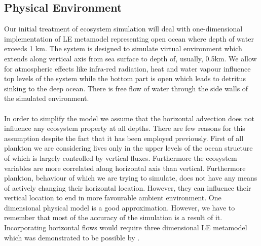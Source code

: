 \documentclass[12pt, a4paper]{report}
\begin{document}
\subsection{Physical Environment}\label{subsec:microsom}
Our initial treatment of ecosystem simulation will deal with one-dimensional implementation of LE metamodel
representing open ocean where depth of water exceeds 1 km. The system is designed to simulate virtual
environment which extends along vertical axis from sea surface to depth of, usually, 0.5km. We allow
for atmospheric effects like infra-red radiation, heat and water vapour influence top levels of the system
while the bottom part is open which leads to detritus sinking to the deep ocean. There is free flow
of water through the side walls of the simulated environment.
\\\\
In order to simplify the model we assume that the horizontal advection does not influence any
ecosystem property at all depths. There are few reasons for this assumption despite the fact that it has
been employed previously. First of all plankton we are considering lives only in the upper levels of the
ocean structure of which is largely controlled by vertical fluxes. Furthermore the ecosystem variables
are more correlated along horizontal axis than vertical. Furthermore plankton, behaviour of which we are
trying to simulate, does not have any means of actively changing their horizontal location. However, they
can influence their vertical location to end in more favourable ambient environment. One dimensional
physical model is a good approximation. However, we have to remember that most of the accuracy of the simulation
is a result of it. Incorporating horizontal flows would require three dimensional LE metamodel which was
demonstrated to be possible by \cite{VEW3D}.
\end{document}
